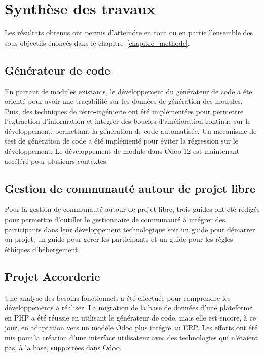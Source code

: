 \label{sec:Conclusion}

\section{Synthèse des travaux}
Les résultats obtenus ont permis d’atteindre en tout ou en partie l’ensemble des sous-objectifs énoncés dans le chapitre~\ref{chapitre_methode}.

\subsection{Générateur de code}

En partant de modules existants, le développement du générateur de code a été orienté pour avoir une traçabilité sur les données de génération des modules. Puis, des techniques de rétro-ingénierie ont été implémentées pour permettre l'extraction d'information et intégrer des boucles d'amélioration continue sur le développement, permettant la génération de code automatisée. Un mécanisme de test de génération de code a été implémenté pour éviter la régression sur le développement. Le développement de module dans Odoo 12 est maintenant accéléré pour plusieurs contextes.

\subsection{Gestion de communauté autour de projet libre}
Pour la gestion de communauté autour de projet libre, trois guides ont été rédigés pour permettre d'outiller le gestionnaire de communauté à intégrer des participants dans leur développement technologique soit un guide pour démarrer un projet, un guide pour gérer les participants et un guide pour les règles éthiques d'hébergement.

\subsection{Projet Accorderie}

Une analyse des besoins fonctionnels a été effectuée pour comprendre les développements à réaliser. La migration de la base de données d'une plateforme en PHP a été réussie en utilisant le générateur de code, mais elle est encore, à ce jour, en adaptation vers un modèle Odoo plus intégré au ERP. Les efforts ont été mis pour la création d’une interface utilisateur avec des technologies qui n’étaient pas, à la base, supportées dans Odoo.

